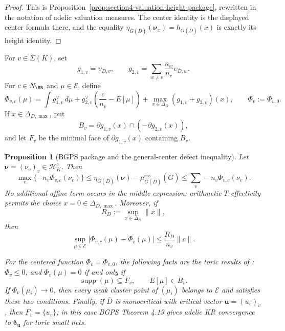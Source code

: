 \documentclass[10pt,a4paper]{amsart}
\theoremstyle{plain}
\newtheorem{proposition}[theorem]{Proposition}
\theoremstyle{plain}
\numberwithin{equation}{section}
\providecommand{\bD}{\overline{D}}
\providecommand{\muess}{\mu^{\mathrm{ess}}}
\begin{document}
\begin{proof}
	This is Proposition~\ref{prop:section4-valuation-height-package}, rewritten in
	the notation of adelic valuation measures.  The center identity is the displayed
	center formula there, and the equality
	\(\eta_{\overline G(\bD)}(\boldsymbol\nu_x)=h_{\overline G(\bD)}(x)\) is exactly
	its height identity.
\end{proof}

For \(v\in\Sigma(K)\), set
\[
g_{1,v}=\upsilon_{\bD,v},
\qquad
g_{2,v}=\sum_{w\ne v}\frac{n_w}{n_v}\upsilon_{\bD,w}.
\]
For \(c\in N_\BR\) and \(\mu\in\mathcal E\), define
\[
\Phi_{v,c}(\mu)
=
\int g_{1,v}^{\vee}\,d\mu
+g_{2,v}^{\vee}\!\left(\frac{c}{n_v}-E[\mu]\right)
+\max_{x\in\Delta_D}(g_{1,v}+g_{2,v})(x),
\qquad
\Phi_v:=\Phi_{v,0}.
\]
If \(x\in\Delta_{D,\max}\), put
\[
B_v=\partial g_{1,v}(x)\cap(-\partial g_{2,v}(x)),
\]
and let \(F_v\) be the minimal face of \(\partial g_{1,v}(x)\) containing
\(B_v\).

\begin{proposition}[BGPS package and the general-center defect inequality]
	\label{input:bgps-kr}
	Let \(\boldsymbol\nu=(\nu_v)_v\in\mathcal H_K^c\).  Then
	\[
	\max_v\{-n_v\Phi_{v,c}(\nu_v)\}
	\le
	\eta_{\overline G(\bD)}(\boldsymbol\nu)
	-\muess_{\overline G(\bD)}(\overline G)
	\le
	\sum_v -n_v\Phi_{v,c}(\nu_v).
	\]
	No additional affine term occurs in the middle expression: arithmetic
	\(T\)-effectivity permits the choice \(x=0\in\Delta_{D,\max}\).  Moreover, if
	\[
	R_D:=\sup_{x\in\Delta_D}\|x\|,
	\]
	then
	\[
	\sup_{\mu\in\mathcal E}
	\bigl|\Phi_{v,c}(\mu)-\Phi_v(\mu)\bigr|
	\le \frac{R_D}{n_v}\|c\|.
	\]
	
	For the centered function \(\Phi_v=\Phi_{v,0}\), the following facts are the
	toric results of \cite[Propositions 3.9, 3.11, 3.14 and 4.16, Lemma 4.5,
	and Theorem 4.19]{BGPS19}: \(\Phi_v\le0\), and \(\Phi_v(\mu)=0\) if and only if
	\[
	\operatorname{supp}(\mu)\subseteq F_v,\qquad E[\mu]\in B_v.
	\]
	If \(\Phi_v(\mu_i)\to0\), then every weak cluster point of \((\mu_i)\) belongs
	to \(\mathcal E\) and satisfies these two conditions.  Finally, if \(\bD\) is
	monocritical with critical vector \(\mathbf u=(u_v)_v\), then \(F_v=\{u_v\}\);
	in this case BGPS Theorem 4.19 gives adelic KR convergence to
	\(\boldsymbol\delta_{\mathbf u}\) for toric small nets.
\end{proposition}
\end{document}
